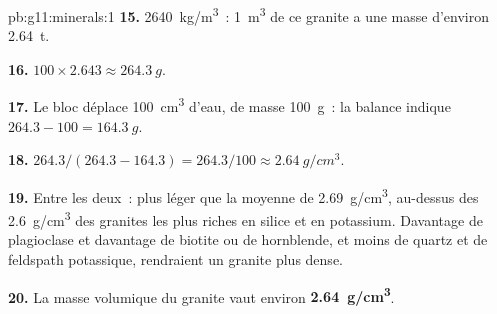 \begin{solution}{pb:g11:minerals:1}
\textbf{15.} \qty{2640}{kg/m^3}~: \qty{1}{m^3} de ce granite a une masse
d'environ \qty{2.64}{t}.

\textbf{16.} $100 \times 2.643 \approx \qty{264.3}{g}$.

\textbf{17.} Le bloc déplace \qty{100}{cm^3} d'eau, de masse
\qty{100}{g}~: la balance indique $264.3 - 100 = \qty{164.3}{g}$.

\textbf{18.} $264.3/(264.3 - 164.3) = 264.3/100 \approx \qty{2.64}{g/cm^3}$.

\textbf{19.} Entre les deux~: plus léger que la moyenne de
\qty{2.69}{g/cm^3}, au-dessus des \qty{2.6}{g/cm^3} des granites les plus
riches en silice et en potassium. Davantage de plagioclase et davantage de
biotite ou de hornblende, et moins de quartz et de feldspath potassique,
rendraient un granite plus dense.

\textbf{20.} La masse volumique du granite vaut environ
\textbf{\qty{2.64}{g/cm^3}}.
\end{solution}
